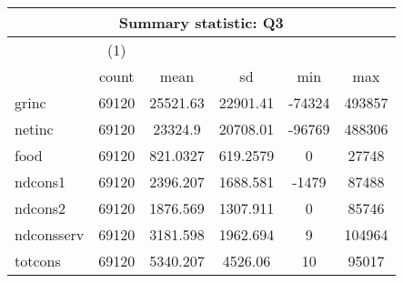 \begin{tabular}{l*{1}{ccccc}}
\hline\hline
\multicolumn{6}{c}{Summary statistic: Q3}  \\
\hline
            &\multicolumn{1}{c}{(1)}&            &            &            &            \\
            &       count&        mean&          sd&         min&         max\\
\hline
grinc       &       69120&    25521.63&    22901.41&      -74324&      493857\\
netinc      &       69120&     23324.9&    20708.01&      -96769&      488306\\
food        &       69120&    821.0327&    619.2579&           0&       27748\\
ndcons1     &       69120&    2396.207&    1688.581&       -1479&       87488\\
ndcons2     &       69120&    1876.569&    1307.911&           0&       85746\\
ndconsserv  &       69120&    3181.598&    1962.694&           9&      104964\\
totcons     &       69120&    5340.207&     4526.06&          10&       95017\\
\hline\hline
\end{tabular}